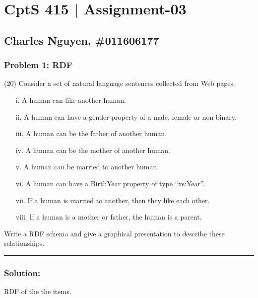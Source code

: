 \documentclass[12pt,letterpaper]{article}
\begin{document}
\section*{CptS 415 | Assignment-03 }
\subsection*{Charles Nguyen, \#011606177 }

\subsubsection*{Problem 1: \textbf{RDF}}
(20) Consider a set of natural language sentences collected from Web pages.

\begin{enumerate}
    \item[i.    ] A human can like another human.
    \item[ii.   ] A human can have a gender property of a male, female or non-binary.
    \item[iii.  ] A human can be the father of another human.
    \item[iv.   ] A human can be the mother of another human.
    \item[v.    ] A human can be married to another human.
    \item[vi.   ] A human can have a BirthYear property of type “xs:Year”.
    \item[vii.  ] If a human is married to another, then they like each other.
    \item[viii. ] If a human is a mother or father, the human is a parent.
\end{enumerate}

Write a RDF schema and give a graphical presentation to describe these
relationships.

\hrule

\subsubsection*{Solution:}
RDF of the the items.
\end{document}
